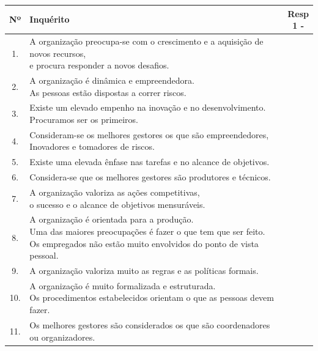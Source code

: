 \vspace{1cm}
\newline
\begin{table}[h!]
	\begin{adjustbox}{max width=\textwidth}
		\begin{tabular}{ |c|l|c| }
			\hline
			\rowcolor[gray]{0.5}
			Nº & Inquérito & \makecell[l]{Resp \\ 1 \; - \; 7} \\
			\hline
			1. & \makecell[l]{A organização preocupa-se com o crescimento e a aquisição de novos recursos, \\ e procura responder a novos desafios.} & \\
			\hline
			2. & \makecell[l]{A organização é dinâmica e empreendedora. \\ As pessoas estão dispostas a correr riscos.} & \\
			\hline
			3. & \makecell[l]{Existe um elevado empenho na inovação e no desenvolvimento. \\ Procuramos ser os primeiros.} & \\
			\hline
			4. & \makecell[l]{Consideram-se os melhores gestores os que são empreendedores, \\ Inovadores e tomadores de riscos.} & \\
			\hline
			5. & Existe uma elevada ênfase nas tarefas e no alcance de objetivos. & \\
			\hline
			6. & Considera-se que os melhores gestores são produtores e técnicos. & \\
			\hline
			7. & \makecell[l]{A organização valoriza as ações competitivas, \\ o sucesso e o alcance de objetivos mensuráveis.} & \\
			\hline
			8. & \makecell[l]{A organização é orientada para a produção. \\ Uma das maiores preocupações é fazer o que tem que ser feito. \\ Os empregados não estão muito envolvidos do ponto de vista pessoal.} & \\
			\hline
			9. & A organização valoriza muito as regras e as políticas formais. & \\
			\hline
			10. & \makecell[l]{A organização é muito formalizada e estruturada. \\ Os procedimentos estabelecidos orientam o que as pessoas devem fazer.} & \\
			\hline
			11. & Os melhores gestores são considerados os que são coordenadores ou organizadores. & \\

\end{tabular}
\end{adjustbox}
\end{table}
